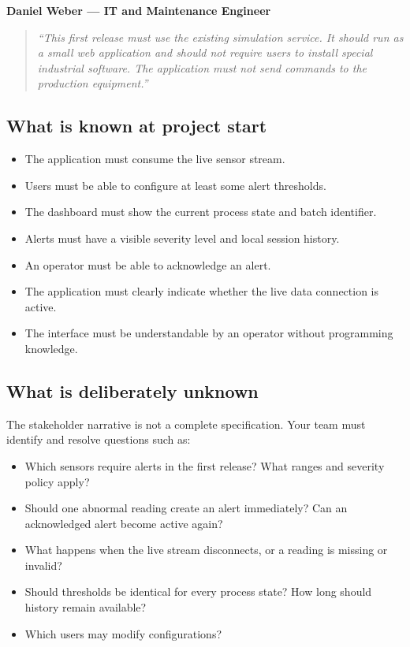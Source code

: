 \documentclass[11pt,a4paper]{article}
\newcommand{\quoteitem}[1]{\begin{quote}\itshape #1\end{quote}}
\begin{document}
\textbf{Daniel Weber --- IT and Maintenance Engineer}
\quoteitem{``This first release must use the existing simulation service. It should run as a small web application and should not require users to install special industrial software. The application must not send commands to the production equipment.''}

\subsection{What is known at project start}
\begin{itemize}
\item The application must consume the live sensor stream.
\item Users must be able to configure at least some alert thresholds.
\item The dashboard must show the current process state and batch identifier.
\item Alerts must have a visible severity level and local session history.
\item An operator must be able to acknowledge an alert.
\item The application must clearly indicate whether the live data connection is active.
\item The interface must be understandable by an operator without programming knowledge.
\end{itemize}

\subsection{What is deliberately unknown}
The stakeholder narrative is not a complete specification. Your team must identify and resolve questions such as:
\begin{itemize}
\item Which sensors require alerts in the first release? What ranges and severity policy apply?
\item Should one abnormal reading create an alert immediately? Can an acknowledged alert become active again?
\item What happens when the live stream disconnects, or a reading is missing or invalid?
\item Should thresholds be identical for every process state? How long should history remain available?
\item Which users may modify configurations?
\end{itemize}
\end{document}
